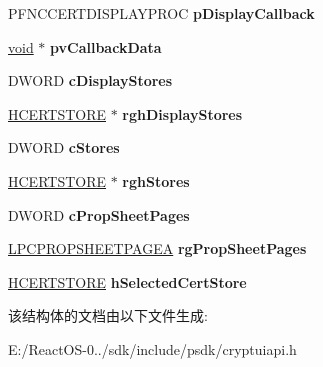 \begin{DoxyCompactItemize}
P\+F\+N\+C\+C\+E\+R\+T\+D\+I\+S\+P\+L\+A\+Y\+P\+R\+OC {\bfseries p\+Display\+Callback}
\item 
\mbox{\label{struct___c_r_y_p_t_u_i___s_e_l_e_c_t_c_e_r_t_i_f_i_c_a_t_e___s_t_r_u_c_t_a_a38afda704c7346f92d8ed73cba49ce35}} 
\hyperlink{interfacevoid}{void} $\ast$ {\bfseries pv\+Callback\+Data}
\item 
\mbox{\label{struct___c_r_y_p_t_u_i___s_e_l_e_c_t_c_e_r_t_i_f_i_c_a_t_e___s_t_r_u_c_t_a_af7f5a283aed8971249c26da6931ac4a9}} 
D\+W\+O\+RD {\bfseries c\+Display\+Stores}
\item 
\mbox{\label{struct___c_r_y_p_t_u_i___s_e_l_e_c_t_c_e_r_t_i_f_i_c_a_t_e___s_t_r_u_c_t_a_a1b31d3eac721ea2d6fafc6a7537ea7d7}} 
\hyperlink{interfacevoid}{H\+C\+E\+R\+T\+S\+T\+O\+RE} $\ast$ {\bfseries rgh\+Display\+Stores}
\item 
\mbox{\label{struct___c_r_y_p_t_u_i___s_e_l_e_c_t_c_e_r_t_i_f_i_c_a_t_e___s_t_r_u_c_t_a_acf396eede9fe5c237c16825666a9c180}} 
D\+W\+O\+RD {\bfseries c\+Stores}
\item 
\mbox{\label{struct___c_r_y_p_t_u_i___s_e_l_e_c_t_c_e_r_t_i_f_i_c_a_t_e___s_t_r_u_c_t_a_a1838b67740cf644089490be9f15efaa7}} 
\hyperlink{interfacevoid}{H\+C\+E\+R\+T\+S\+T\+O\+RE} $\ast$ {\bfseries rgh\+Stores}
\item 
\mbox{\label{struct___c_r_y_p_t_u_i___s_e_l_e_c_t_c_e_r_t_i_f_i_c_a_t_e___s_t_r_u_c_t_a_a1168ffbe9854dbb97b20a86dbc1a5eb9}} 
D\+W\+O\+RD {\bfseries c\+Prop\+Sheet\+Pages}
\item 
\mbox{\label{struct___c_r_y_p_t_u_i___s_e_l_e_c_t_c_e_r_t_i_f_i_c_a_t_e___s_t_r_u_c_t_a_a28d83fa6309e956135dacba1fb28bfec}} 
\hyperlink{struct___p_r_o_p_s_h_e_e_t_p_a_g_e_a}{L\+P\+C\+P\+R\+O\+P\+S\+H\+E\+E\+T\+P\+A\+G\+EA} {\bfseries rg\+Prop\+Sheet\+Pages}
\item 
\mbox{\label{struct___c_r_y_p_t_u_i___s_e_l_e_c_t_c_e_r_t_i_f_i_c_a_t_e___s_t_r_u_c_t_a_af7636ee47ac21c9649208b9cd62a2463}} 
\hyperlink{interfacevoid}{H\+C\+E\+R\+T\+S\+T\+O\+RE} {\bfseries h\+Selected\+Cert\+Store}
\end{DoxyCompactItemize}


该结构体的文档由以下文件生成\+:\begin{DoxyCompactItemize}
\item 
E\+:/\+React\+O\+S-\/0../sdk/include/psdk/cryptuiapi.\+h\end{DoxyCompactItemize}
